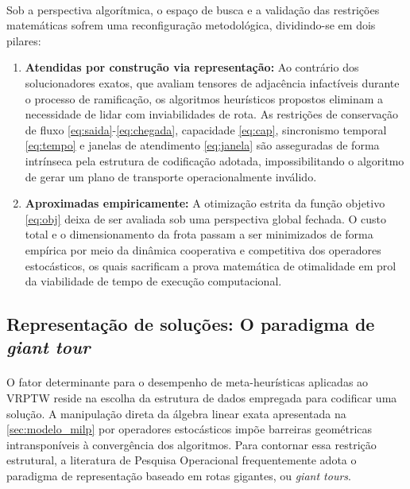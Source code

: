 \paragraph{} Sob a perspectiva algorítmica, o espaço de busca e a validação das restrições matemáticas sofrem uma reconfiguração metodológica, dividindo-se em dois pilares:
\begin{enumerate}
    \item \textbf{Atendidas por construção via representação:} Ao contrário dos solucionadores exatos, que avaliam tensores de adjacência infactíveis durante o processo de ramificação, os algoritmos heurísticos propostos eliminam a necessidade de lidar com inviabilidades de rota. As restrições de conservação de fluxo \eqref{eq:saida}-\eqref{eq:chegada}, capacidade \eqref{eq:cap}, sincronismo temporal \eqref{eq:tempo} e janelas de atendimento \eqref{eq:janela} são asseguradas de forma intrínseca pela estrutura de codificação adotada, impossibilitando o algoritmo de gerar um plano de transporte operacionalmente inválido.
    \item \textbf{Aproximadas empiricamente:} A otimização estrita da função objetivo \eqref{eq:obj} deixa de ser avaliada sob uma perspectiva global fechada. O custo total e o dimensionamento da frota passam a ser minimizados de forma empírica por meio da dinâmica cooperativa e competitiva dos operadores estocásticos, os quais sacrificam a prova matemática de otimalidade em prol da viabilidade de tempo de execução computacional.
\end{enumerate}


\subsection{Representação de soluções: O paradigma de \textit{giant tour}}
\label{subsec:giant_tour}

\paragraph{} O fator determinante para o desempenho de meta-heurísticas aplicadas ao VRPTW reside na escolha da estrutura de dados empregada para codificar uma solução. A manipulação direta da álgebra linear exata apresentada na \autoref{sec:modelo_milp} por operadores estocásticos impõe barreiras geométricas intransponíveis à convergência dos algoritmos. Para contornar essa restrição estrutural, a literatura de Pesquisa Operacional frequentemente adota o paradigma de representação baseado em rotas gigantes, ou \textit{giant tours}.


